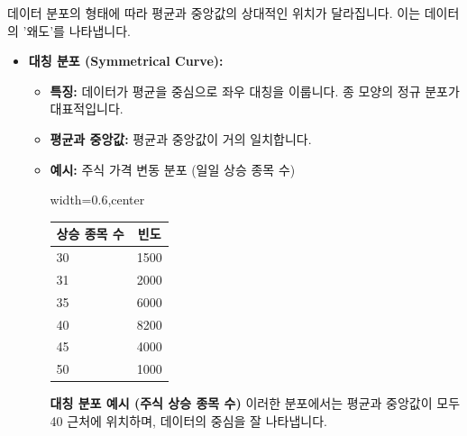 \documentclass[11pt,a4paper]{book}
\providecommand{\captionof}[2]{\textbf{#2}}
\theoremstyle{definition}
\begin{document}
\begin{infobox}[title=평균과 중앙값의 관계: 분포의 왜도 (Skewness)]
데이터 분포의 형태에 따라 평균과 중앙값의 상대적인 위치가 달라집니다. 이는 데이터의 '왜도'를 나타냅니다.

\begin{itemize}
    \item \textbf{대칭 분포 (Symmetrical Curve):}
    \begin{itemize}
        \item \textbf{특징:} 데이터가 평균을 중심으로 좌우 대칭을 이룹니다. 종 모양의 정규 분포가 대표적입니다.
        \item \textbf{평균과 중앙값:} 평균과 중앙값이 거의 일치합니다.
        \item \textbf{예시:} 주식 가격 변동 분포 (일일 상승 종목 수)
        \begin{adjustbox}{width=0.6\textwidth,center}
        \begin{tabular}{lc}
        \toprule
        \textbf{상승 종목 수} & \textbf{빈도} \\
        \midrule
        30 & 1500 \\
        31 & 2000 \\
        35 & 6000 \\
        40 & 8200 \\
        45 & 4000 \\
        50 & 1000 \\
        \bottomrule
        \end{tabular}
        \end{adjustbox}
        \captionof{table}{대칭 분포 예시 (주식 상승 종목 수)}
        \label{tab:symmetrical_curve}
        이러한 분포에서는 평균과 중앙값이 모두 40 근처에 위치하며, 데이터의 중심을 잘 나타냅니다.
    \end{itemize}


\end{itemize}
\end{infobox}
\end{document}
